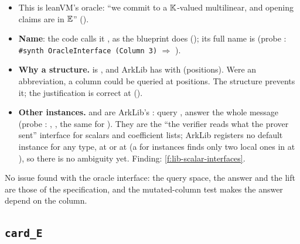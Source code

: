 \begin{itemize}
\item This is leanVM's oracle: \enquote{we commit to a $\mathbb{K}$-valued multilinear, and opening claims
  are in $\mathbb{E}$} (\allowbreak{}\allowbreak{}\allowbreak{}).
\item \textbf{Name}: the code calls it , as the blueprint does
  (); its full name is \allowbreak{}\allowbreak{} (probe
  : \texttt{\#synth OracleInterface (Column 3)} $\Rightarrow$ ).
\item \textbf{Why a structure.}  is 
  , and ArkLib has  with
   (positions). Were  an abbreviation, a column could be queried
  at positions. The structure prevents it; the justification is correct at 
  ().
\item \textbf{Other instances.}  and  are
  ArkLib's : query , answer the whole message (probe :
  \allowbreak{}, \allowbreak{}, the
  same for ). They are the \enquote{the verifier reads what the prover sent} interface
  for scalars and coefficient lists; ArkLib registers no default instance for any type, at
   or at  (a  for  instances finds
  only two local ones in \allowbreak{}\allowbreak{}\allowbreak{}\allowbreak{} at
  ), so there is no ambiguity yet. Finding: \cref{f:lib-scalar-interfaces}.
\end{itemize}
No issue found with the oracle interface: the query space, the answer and the lift are those of
the specification, and the mutated-column test makes the answer depend on the column.

\subsection{\texorpdfstring{\texttt{card\_E}}{card\_E}}\label{sec:gen-l0-card}

